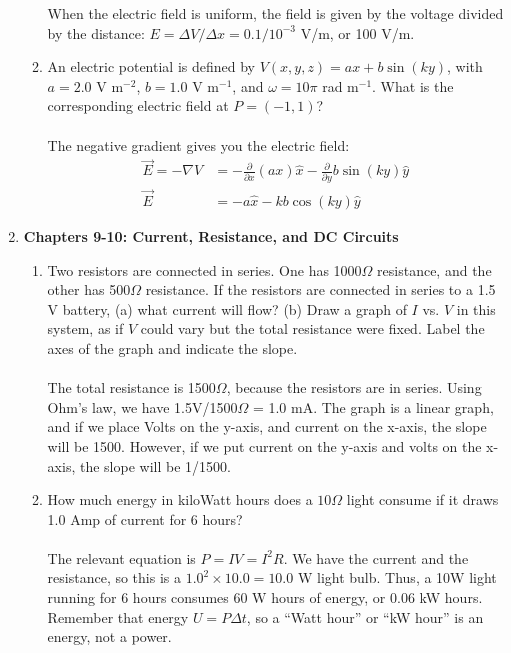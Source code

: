 \documentclass[10pt]{article}
\begin{document}
\begin{enumerate}
\begin{enumerate}
When the electric field is uniform, the field is given by the voltage divided by the distance: $E = \Delta V / \Delta x = 0.1/10^{-3}$ V/m, or 100 V/m. \\
\item An electric potential is defined by $V(x,y,z) = a x + b \sin(ky)$, with $a = 2.0$ V m$^{-2}$, $b = 1.0$ V m$^{-1}$, and $\omega = 10\pi$ rad m$^{-1}$.  What is the corresponding electric field at $P = (-1,1)$? \\ \\
The negative gradient gives you the electric field:
\begin{align}
\vec{E} = -\nabla V &= -\frac{\partial}{\partial x} (ax)\hat{x} - \frac{\partial}{\partial y} b\sin(ky)\hat{y} \\
\vec{E} &= -a\hat{x}-kb \cos(ky)\hat{y}
\end{align}
\end{enumerate}
\item \textbf{Chapters 9-10: Current, Resistance, and DC Circuits}
\begin{enumerate}
\item Two resistors are connected in series.  One has 1000$\Omega$ resistance, and the other has 500$\Omega$ resistance.  If the resistors are connected in series to a 1.5 V battery, (a) what current will flow? (b) Draw a graph of $I$ vs. $V$ in this system, as if $V$ could vary but the total resistance were fixed.  Label the axes of the graph and indicate the slope. \\ \\
The total resistance is 1500$\Omega$, because the resistors are in series.  Using Ohm's law, we have 1.5V/1500$\Omega$ = 1.0 mA.  The graph is a linear graph, and if we place Volts on the y-axis, and current on the x-axis, the slope will be 1500.  However, if we put current on the y-axis and volts on the x-axis, the slope will be 1/1500. \\
\item How much energy in kiloWatt hours does a $10\Omega$ light consume if it draws 1.0 Amp of current for 6 hours? \\ \\
The relevant equation is $P=IV = I^2 R$.  We have the current and the resistance, so this is a $1.0^2 \times 10.0 = 10.0$ W light bulb.  Thus, a 10W light running for 6 hours consumes 60 W hours of energy, or 0.06 kW hours.  Remember that energy $U = P \Delta t$, so a ``Watt hour'' or ``kW hour'' is an energy, not a power. \\
\begin{figure}

\end{figure}
\end{enumerate}
\end{enumerate}
\end{document}
